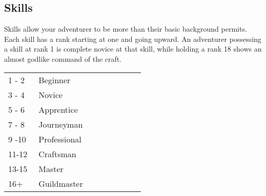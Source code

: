 \begin{multicols*}{2}
\section{Skills}
\label{create-skills}
Skills allow your adventurer to be more than their basic background permits. Each skill has a rank starting at one and going upward. An adventurer possessing a skill at rank 1 is complete novice at that skill, while holding a rank 18 shows an almost godlike command of the craft.
\begin{tcolorbox}[breakable,boxrule=0pt]
\begin{tabular}{p{0.2\linewidth} p{0.7\linewidth}}
1 - 2 & Beginner\\
3 - 4 & Novice\\
5 - 6 & Apprentice\\
7 - 8 & Journeyman\\
9 -10 & Professional\\
11-12 & Craftsman\\
13-15 & Master\\
16+ & Guildmaster\\
\end{tabular}
\end{tcolorbox}

\end{multicols*}
